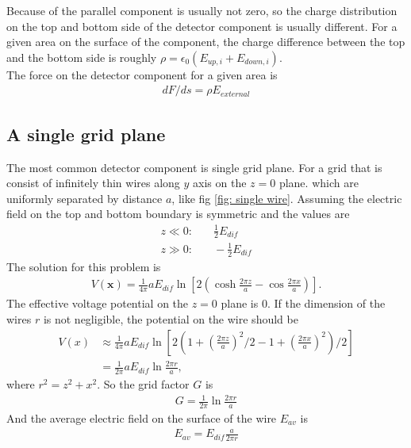 Because of the parallel component is usually not zero, so the charge distribution on the top and bottom side of the detector component is usually different. For a given area on the surface of the component, the charge difference between the top and the bottom side is roughly $\rho = \epsilon_0(E_{up, i}+E_{down, i})$.  
\\
The force on the detector component for a given area is 
\begin{align}
dF/ds = \rho E_{external}
\end{align}





\subsection{A single grid plane}
The most common detector component is single grid plane. For a grid that is consist of infinitely thin wires along $y$ axis on the $z=0$ plane. which are uniformly separated by distance $a$, like fig \ref{fig: single wire}. Assuming the electric field on the top and bottom boundary is symmetric and the values are
\begin{align}
z \ll 0:& \quad  \frac{1}{2}E_{dif}\\
z \gg 0:& \quad -\frac{1}{2}E_{dif}
\end{align}
The solution for this problem is 
\begin{align}
V(\boldsymbol{x}) = \frac{1}{4 \pi} a E_{dif}\ln [2(\cosh\frac{2 \pi z}{a}-\cos\frac{2 \pi x}{a})].
\end{align}
The effective voltage potential on the $z=0$ plane is 0. 
If the dimension of the wires $r$ is not negligible,  the potential on the wire should be 
\begin{align}
V(x) &\approx \frac{1}{4 \pi} a E_{dif}\ln [2(1+(\frac{2 \pi z}{a})^2/2-1+(\frac{2 \pi x}{a})^2)/2] \\
& = \frac{1}{2 \pi} a E_{dif}\ln \frac{2 \pi r}{a},
\end{align}
where $r^2 = z^2 +x^2$.
So the grid factor $G$ is 
\begin{align}
G = \frac{1}{2 \pi} \ln \frac{2 \pi r}{a}
\end{align}
And the average electric field on the surface of the wire $E_{av}$ is 
\begin{align}
E_{av}= E_{dif}\frac{a}{2 \pi r}
\end{align}
